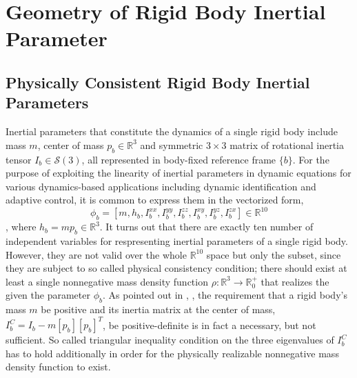 \documentclass[letterpaper, 10 pt, conference]{ieeeconf}  %
\begin{document}
\section{Geometry of Rigid Body Inertial Parameter}
\subsection{Physically Consistent Rigid Body Inertial Parameters}
Inertial parameters that constitute the dynamics of a single rigid body include mass $m$, center of mass $p_{b}\in\mathbb{R}^{3}$ and symmetric $3\times 3$ matrix of rotational inertia tensor $I_{b}\in\mathcal{S}(3)$, all represented in body-fixed reference frame $\{b\}$. For the purpose of exploiting the linearity of inertial parameters in dynamic equations for various dynamics-based applications including dynamic identification and adaptive control, it is common to express them in the vectorized form,
\begin{equation*}
\phi_{b} = [m,h_{b},I_{b}^{xx},I_{b}^{yy},I_{b}^{zz},I_{b}^{xy},I_{b}^{yz},I_{b}^{zx}]\in\mathbb{R}^{10}
\end{equation*}
, where $h_{b} = mp_{b}\in \mathbb{R}^{3}$. It turns out that there are exactly ten number of independent variables for respresenting inertial parameters of a single rigid body. However, they are not valid over the whole $\mathbb{R}^{10}$ space but only the subset, since they are subject to so called physical consistency condition; there should exist at least a single nonnegative mass density function $\rho : \mathbb{R}^{3} \rightarrow \mathbb{R}^{+}_{0}$ that realizes the given the parameter $\phi_{b}$. As pointed out in \cite{Wittenberg_Dynamics}, \cite{Traversaro_IROS}, the requirement that a rigid body's mass $m$ be positive
and its inertia matrix at the center of mass, $I_{b}^{C}=I_{b}-m[p_{b}][p_{b}]^{T}$, be positive-definite is in fact a necessary, but not sufficient. So called triangular inequality condition on the three eigenvalues of $I_{b}^{C}$ has to hold additionally in order for the physically realizable nonnegative mass density function to exist. 
\end{document}
